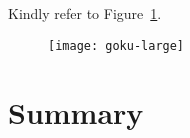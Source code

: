 Kindly refer to Figure~\ref{fig:largegoku}.

\begin{figure}[!ht]
	\centering
	\texttt{[image: goku-large]}
	\caption[Short Random Caption]{\blindtext}        
	\label{fig:largegoku}
\end{figure}

\section{Summary}
\blindtext
